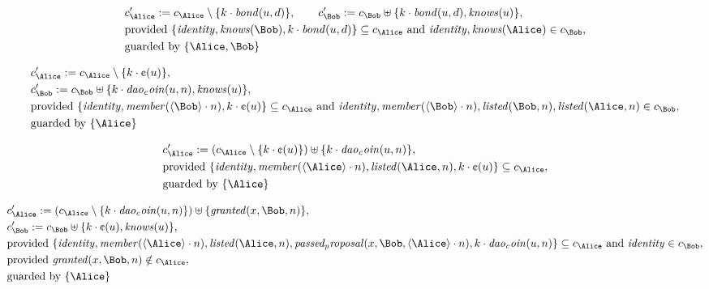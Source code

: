 \begin{align*}
&
c'_
{
\Alice
}
 := 
c_
{
\Alice
}
 \setminus 
\{
k
\cdot
\mathit{
bond
}
(
u
,
d
)
\}
, \qquad 
c'_
{
\Bob
}
 := 
c_
{
\Bob
}
 \uplus 
\{
k
\cdot
\mathit{
bond
}
(
u
,
d
)
,
\mathit{
knows
}
(
u
)
\}
,\\
&
\text{provided } 
\{
\mathit{
identity
}
,
\mathit{
knows
}
(
\Bob
)
,
k
\cdot
\mathit{
bond
}
(
u
,
d
)
\}
 \subseteq c_
{
\Alice
}
 \text{ and } 
\mathit{
identity
}
,
\mathit{
knows
}
(
\Alice
)
 \in c_
{
\Bob
}
,\\
&
\text{guarded by } \{
\Alice
,
\Bob
\}
\end{align*}

\begin{align*}
&
c'_
{
\Alice
}
 := 
c_
{
\Alice
}
 \setminus 
\{
k
\cdot
\text{\textcent}
(
u
)
\}
,\\
&
c'_
{
\Bob
}
 := 
c_
{
\Bob
}
 \uplus 
\{
k
\cdot
\mathit{
dao_coin
}
(
u
,
n
)
,
\mathit{
knows
}
(
u
)
\}
,\\
&
\text{provided } 
\{
\mathit{
identity
}
,
\mathit{
member
}
(
\langle
\Bob
\rangle
\cdot
n
)
,
k
\cdot
\text{\textcent}
(
u
)
\}
 \subseteq c_
{
\Alice
}
 \text{ and } 
\mathit{
identity
}
,
\mathit{
member
}
(
\langle
\Bob
\rangle
\cdot
n
)
,
\mathit{
listed
}
(
\Bob
,
n
)
,
\mathit{
listed
}
(
\Alice
,
n
)
 \in c_
{
\Bob
}
,\\
&
\text{guarded by } \{
\Alice
\}
\end{align*}

\begin{align*}
&
c'_
{
\Alice
}
 := 
(c_
{
\Alice
}
 \setminus 
\{
k
\cdot
\text{\textcent}
(
u
)
\}
) \uplus 
\{
k
\cdot
\mathit{
dao_coin
}
(
u
,
n
)
\}
,\\
&
\text{provided } 
\{
\mathit{
identity
}
,
\mathit{
member
}
(
\langle
\Alice
\rangle
\cdot
n
)
,
\mathit{
listed
}
(
\Alice
,
n
)
,
k
\cdot
\text{\textcent}
(
u
)
\}
 \subseteq c_
{
\Alice
}
,\\
&
\text{guarded by } \{
\Alice
\}
\end{align*}

\begin{align*}
&
c'_
{
\Alice
}
 := 
(c_
{
\Alice
}
 \setminus 
\{
k
\cdot
\mathit{
dao_coin
}
(
u
,
n
)
\}
) \uplus 
\{
\mathit{
granted
}
(
x
,
\Bob
,
n
)
\}
,\\
&
c'_
{
\Bob
}
 := 
c_
{
\Bob
}
 \uplus 
\{
k
\cdot
\text{\textcent}
(
u
)
,
\mathit{
knows
}
(
u
)
\}
,\\
&
\text{provided } 
\{
\mathit{
identity
}
,
\mathit{
member
}
(
\langle
\Alice
\rangle
\cdot
n
)
,
\mathit{
listed
}
(
\Alice
,
n
)
,
\mathit{
passed_proposal
}
(
x
,
\Bob
,
\langle
\Alice
\rangle
\cdot
n
)
,
k
\cdot
\mathit{
dao_coin
}
(
u
,
n
)
\}
 \subseteq c_
{
\Alice
}
 \text{ and } 
\mathit{
identity
}
 \in c_
{
\Bob
}
,\\
&
\text{provided } 
\mathit{
granted
}
(
x
,
\Bob
,
n
)
 \notin c_
{
\Alice
}
,\\
&
\text{guarded by } \{
\Alice
\}
\end{align*}
